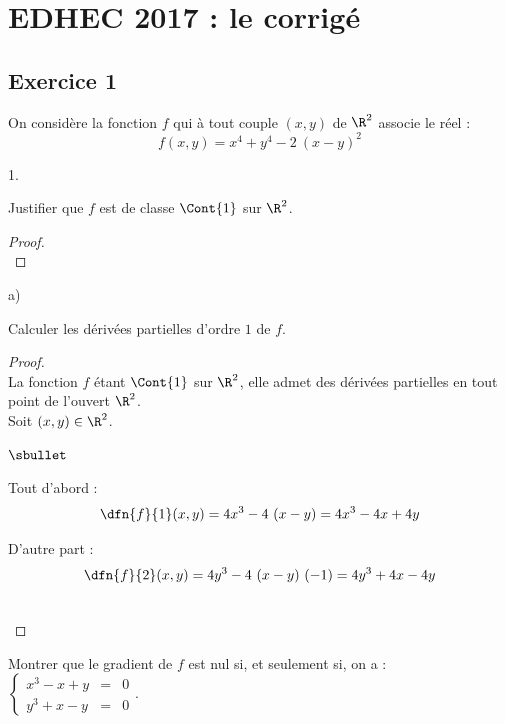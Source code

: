\chapter*{EDHEC 2017 : le corrigé}
  
%

\section*{Exercice 1}

\noindent
On considère la fonction $f$ qui à tout couple $(x,y)$ de $\R^{2}$
associe le réel :
\[
f(x,y) = x^{4} + y^{4} - 2 \ (x-y)^{2}
\]
\begin{noliste}{1.}
  \setlength{\itemsep}{4mm}
\item Justifier que $f$ est de classe $\Cont{1}$ sur $\R^{2}$.

  \begin{proof}~%
    ~\\[-.8cm] 
  \end{proof}

\item
  \begin{noliste}{a)}
    \setlength{\itemsep}{2mm}
  \item Calculer les dérivées partielles d'ordre $1$ de $f$.

    \begin{proof}~\\%
      La fonction $f$ étant $\Cont{1}$ sur $\R^2$, elle admet des
      dérivées partielles en tout point de l'ouvert $\R^2$.\\
      Soit $(x, y) \in \R^2$.
      \begin{noliste}{$\sbullet$}
      \item Tout d'abord :
        \[
        \dfn{f}{1}(x, y) = 4 x^3 - 4 \ (x-y) = 4 x^3 - 4 x + 4y
        \]
      \item D'autre part :
        \[
        \dfn{f}{2}(x, y) = 4 y^3 - 4 \ (x-y) \ (-1) = 4 y^3 + 4 x - 4y
        \]
      \end{noliste}
      ~\\[-1cm]
    \end{proof}

  \item Montrer que le gradient de $f$ est nul si, et seulement si, on
    a : $ \left\{
      \begin{array}{rcl}
        x^{3}-x + y & = & 0 \\
        y^{3} + x-y & = & 0
      \end{array}
    \right.$.


\end{noliste}
\end{noliste}

